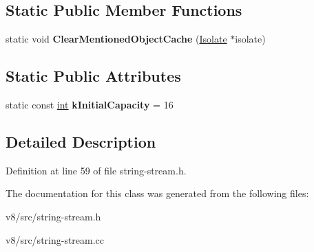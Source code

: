 \subsection*{Static Public Member Functions}
\begin{DoxyCompactItemize}
\item 
\mbox{\label{classv8_1_1internal_1_1StringStream_a51afd68ec786821ea978e5855e9afe62}} 
static void {\bfseries Clear\+Mentioned\+Object\+Cache} (\mbox{\hyperlink{classv8_1_1internal_1_1Isolate}{Isolate}} $\ast$isolate)
\end{DoxyCompactItemize}
\subsection*{Static Public Attributes}
\begin{DoxyCompactItemize}
\item 
\mbox{\label{classv8_1_1internal_1_1StringStream_a5893ecef00152a5d11918d88d6d1ff02}} 
static const \mbox{\hyperlink{classint}{int}} {\bfseries k\+Initial\+Capacity} = 16
\end{DoxyCompactItemize}


\subsection{Detailed Description}


Definition at line 59 of file string-\/stream.\+h.



The documentation for this class was generated from the following files\+:\begin{DoxyCompactItemize}
\item 
v8/src/string-\/stream.\+h\item 
v8/src/string-\/stream.\+cc\end{DoxyCompactItemize}
